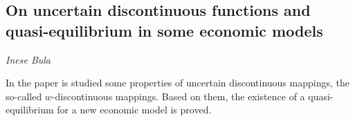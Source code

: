 \documentclass[../booklet.tex]{subfiles}
\begin{document}
\subsection[On uncertain discontinuous functions and quasi-equilibrium in some economic models. {\it Inese Bula}]{On uncertain discontinuous functions and quasi-equilibrium in some economic models}

\begin{center}
  {\it Inese Bula}
\end{center}



In the paper is studied some properties of uncertain discontinuous mappings, the so-called $w$-discontinuous mappings. Based on them, the existence of a quasi-equilibrium for a new economic model is proved.
\end{document}
